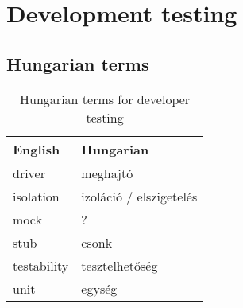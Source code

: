 \chapter{Development testing}




\section{Hungarian terms}

\begin{table}
    \centering
    \small
    \caption{Hungarian terms for developer testing}
    \begin{tabular}{ll}
        \toprule
        \textbf{English} & \textbf{Hungarian} \\
        \midrule
        driver & meghajtó \\
        isolation & izoláció / elszigetelés \\
        mock & ? \\
        stub & csonk \\
        testability & tesztelhetőség \\
        unit & egység \\
        \bottomrule
    \end{tabular}
    \label{tab:overview:hungarian-terms-developer-testing}
\end{table} 